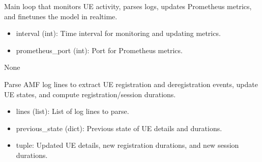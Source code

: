 \documentclass[letterpaper,10pt,english]{sphinxmanual}
\begin{document}
\begin{fulllineitems}
\label{\detokenize{network_watcher:network_watcher.main_loop}}
\pysigstartsignatures
{}
\pysigstopsignatures
\sphinxAtStartPar
Main loop that monitors UE activity, parses logs, updates Prometheus metrics, and fine\sphinxhyphen{}tunes the model in real\sphinxhyphen{}time.
\begin{description}
\begin{itemize}
\item {} 
\sphinxAtStartPar
interval (int): Time interval for monitoring and updating metrics.

\item {} 
\sphinxAtStartPar
prometheus\_port (int): Port for Prometheus metrics.

\end{itemize}

\sphinxAtStartPar
None

\end{description}

\end{fulllineitems}


\begin{fulllineitems}
\label{\detokenize{network_watcher:network_watcher.parse_amf}}
\pysigstartsignatures
{}
\pysigstopsignatures
\sphinxAtStartPar
Parse AMF log lines to extract UE registration and deregistration events,
update UE states, and compute registration/session durations.
\begin{description}
\begin{itemize}
\item {} 
\sphinxAtStartPar
lines (list): List of log lines to parse.

\item {} 
\sphinxAtStartPar
previous\_state (dict): Previous state of UE details and durations.

\end{itemize}

\begin{itemize}
\item {} 
\sphinxAtStartPar
tuple: Updated UE details, new registration durations, and new session durations.

\end{itemize}

\end{description}

\end{fulllineitems}
\end{document}
